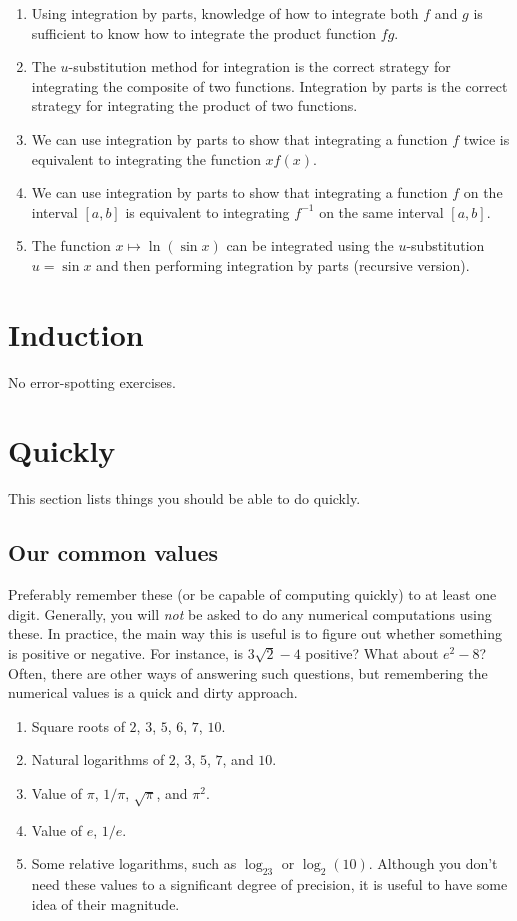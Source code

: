 \documentclass[10pt]{amsart}
\begin{document}
\begin{enumerate}

\item Using integration by parts, knowledge of how to integrate both
  $f$ and $g$ is sufficient to know how to integrate the product
  function $fg$.
\item The $u$-substitution method for integration is the correct
  strategy for integrating the composite of two functions. Integration
  by parts is the correct strategy for integrating the product of
  two functions.
\item We can use integration by parts to show that integrating a
  function $f$ twice is equivalent to integrating the function
  $xf(x)$.
\item We can use integration by parts to show that integrating a
  function $f$ on the interval $[a,b]$ is equivalent to integrating
  $f^{-1}$ on the same interval $[a,b]$.
\item The function $x \mapsto \ln(\sin x)$ can be integrated using the
  $u$-substitution $u = \sin x$ and then performing integration by
  parts (recursive version).
\end{enumerate}

\section{Induction}

No error-spotting exercises.

\section{Quickly}

This section lists things you should be able to do quickly.

\subsection{Our common values}

Preferably remember these (or be capable of computing quickly) to at
least one digit. Generally, you will {\em not} be asked to do any
numerical computations using these. In practice, the main way this is
useful is to figure out whether something is positive or negative. For
instance, is $3\sqrt{2} - 4$ positive? What about $e^2 - 8$? Often,
there are other ways of answering such questions, but remembering the
numerical values is a quick and dirty approach.

\begin{enumerate}
\item Square roots of $2$, $3$, $5$, $6$, $7$, $10$.
\item Natural logarithms of $2$, $3$, $5$, $7$, and $10$.
\item Value of $\pi$, $1/\pi$, $\sqrt{\pi}$, and $\pi^2$.
\item Value of $e$, $1/e$.
\item Some relative logarithms, such as $\log_23$ or
  $\log_2(10)$. Although you don't need these values to a significant
  degree of precision, it is useful to have some idea of their
  magnitude.
\end{enumerate}
\end{document}

